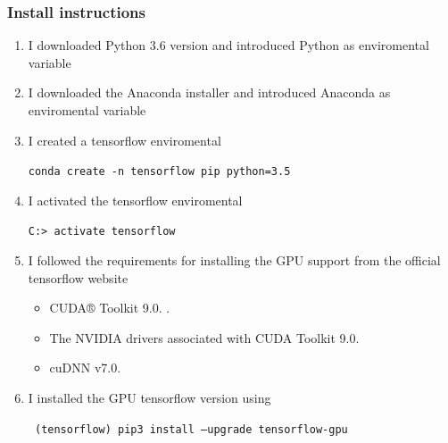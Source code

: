 \documentclass[a4paper,10pt]{article}
\begin{document}
	\subsubsection{Install instructions}
     \begin{enumerate}
 		\item I downloaded Python 3.6 version and introduced Python as enviromental variable
		\vspace{5mm} %
	
	 	\item I downloaded the Anaconda installer and introduced Anaconda as enviromental variable
	
		\vspace{5mm} %
		\item I created a tensorflow enviromental
	
		\texttt{conda create -n tensorflow pip python=3.5} 
		\vspace{5mm} %
	
		\item I activated the tensorflow enviromental
	
		\texttt{C:> activate tensorflow}
		\vspace{5mm} %
	
		\item I followed the requirements for installing the GPU support from the official tensorflow website
		\begin{itemize}
		 \item CUDA® Toolkit 9.0. .
		 \item The NVIDIA drivers associated with CUDA Toolkit 9.0.
		 \item cuDNN v7.0. 
		\end{itemize}
		
		
		\vspace{5mm} %
		
		\item I installed the GPU tensorflow version using
	
		\texttt{
		(tensorflow) pip3 install --upgrade tensorflow-gpu}
		
		\end{enumerate}
	 	
\end{document}
